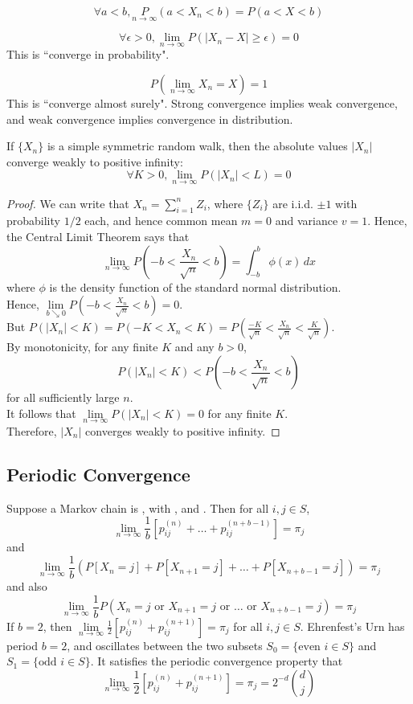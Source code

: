 \documentclass[11pt]{article}
\newcommand{\dur}[3]{{#1}_{#2}^{({#3})}}
\renewcommand{\limit}[1]{\underset{{#1} \rightarrow \infty}{\lim}}
\begin{document}
    $$\forall a < b, \underset{n \rightarrow \infty} P(a < X_n < b) = P(a < X < b)$$

    $$\forall \epsilon > 0, \underset{n \rightarrow \infty}{\lim} P(|X_n - X| \geq \epsilon) = 0$$
    \remark This is ``converge in probability".
    
    $$P(\underset{n \rightarrow \infty}{\lim} X_n = X) = 1$$
    \remark This is ``converge almost surely".
    \remark Strong convergence implies weak convergence, and weak convergence implies convergence in distribution.
    
    
    \proposition If $\{X_n\}$ is a simple symmetric random walk, then the absolute values $|X_n|$ converge weakly to positive infinity: 
    $$\forall K > 0, \limit{n}P(|X_n| < L) = 0$$
    \begin{proof}
    	We can write that $X_n = \sum_{i=1}^n Z_i$, where $\{Z_i\}$ are i.i.d. $\pm 1$ with probability $1/2$ each, and hence common mean $m = 0$ and variance $v = 1$. Hence, the Central Limit Theorem says that
    	$$\limit{n} P(-b < \frac{X_n}{\sqrt{n}} < b) = \int_{-b}^b \phi(x)\,dx$$
    	where $\phi$ is the density function of the standard normal distribution.\\
    	Hence, $\underset{b \searrow 0}{\lim} P(-b < \frac{X_n}{\sqrt{n}}<b) = 0$. \\
    	But $P(|X_n| < K) = P(-K < X_n < K) = P(\frac{-K}{\sqrt{n}} < \frac{X_n}{\sqrt{n}} < \frac{K}{\sqrt{n}})$. \\
    	By monotonicity, for any finite $K$ and any $b > 0$, 
    	$$P(|X_n| < K) < P(-b < \frac{X_n}{\sqrt{n}} < b)$$
    	for all sufficiently large $n$. \\
    	It follows that $\limit{n} P(|X_n| < K) = 0$ for any finite $K$.\\
    	Therefore, $|X_n|$ converges weakly to positive infinity.
    \end{proof}
    
    \subsection{Periodic Convergence}
    Suppose a Markov chain is , with , and . Then for all $i, j \in S$,
    $$\limit{n} \frac{1}{b}[\dur{p}{ij}{n} + \hdots + \dur{p}{ij}{n + b -1}] = \pi_j$$
    and 
    $$\limit{n} \frac{1}{b}(P[X_n = j] + P[X_{n+1} = j] + \hdots + P[X_{n+b-1} = j]) = \pi_j$$
    and also
    $$\limit{n} \frac{1}{b}P(X_n = j \text{ or } X_{n+1} = j \text{ or } \hdots \text{ or } X_{n+b-1} = j ) = \pi_j$$
    \example
    If $b =2$, then $\limit{n} \frac{1}{2}[\dur{p}{ij}{n} + \dur{p}{ij}{n+1}] = \pi_j$ for all $i, j \in S$.
    Ehrenfest's Urn has period $b=2$, and oscillates between the two subsets $S_0 = \{\text{even } i \in S\}$ and $S_1 = \{\text{odd }i\in S\}$. It satisfies the periodic convergence property that
    $$\limit{n}\frac{1}{2}[\dur{p}{ij}{n} + \dur{p}{ij}{n+1}] = \pi_j = 2^{-d}{d\choose j}$$
    
\end{document}
